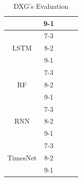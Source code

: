 \documentclass{ieeeojies}
\begin{document}
\begin{table}[H]
\begin{tabular}{|ccccc|}
  \multicolumn{1}{|c|}{}                                   & \multicolumn{1}{c|}{9-1}        & \multicolumn{1}{c|}{}        & \multicolumn{1}{c|}{}          &       \\ \hline
  \multicolumn{1}{|c|}{\multirow{3}{*}{LSTM}}              & \multicolumn{1}{c|}{7-3}            & \multicolumn{1}{c|}{}  & \multicolumn{1}{c|}{}      &  \\ \cline{2-5} 
  \multicolumn{1}{|c|}{}                                   & \multicolumn{1}{c|}{8-2}        & \multicolumn{1}{c|}{}  & \multicolumn{1}{c|}{}      &  \\ \cline{2-5} 
  \multicolumn{1}{|c|}{}                                   & \multicolumn{1}{c|}{9-1}        & \multicolumn{1}{c|}{}  & \multicolumn{1}{c|}{}      &  \\ \hline
  \multicolumn{1}{|c|}{\multirow{3}{*}{RF}}                & \multicolumn{1}{c|}{7-3}            & \multicolumn{1}{c|}{}        & \multicolumn{1}{c|}{}          &       \\ \cline{2-5} 
  \multicolumn{1}{|c|}{}                                   & \multicolumn{1}{c|}{8-2}        & \multicolumn{1}{c|}{}        & \multicolumn{1}{c|}{}          &       \\ \cline{2-5} 
  \multicolumn{1}{|c|}{}                                   & \multicolumn{1}{c|}{9-1}        & \multicolumn{1}{c|}{}        & \multicolumn{1}{c|}{}          &       \\ \hline
  \multicolumn{1}{|c|}{\multirow{3}{*}{RNN}}               & \multicolumn{1}{c|}{7-3}            & \multicolumn{1}{c|}{}        & \multicolumn{1}{c|}{}          &       \\ \cline{2-5} 
  \multicolumn{1}{|c|}{}                                   & \multicolumn{1}{c|}{8-2}        & \multicolumn{1}{c|}{}        & \multicolumn{1}{c|}{}          &       \\ \cline{2-5} 
  \multicolumn{1}{|c|}{}                                   & \multicolumn{1}{c|}{9-1}        & \multicolumn{1}{c|}{}        & \multicolumn{1}{c|}{}          &       \\ \hline
  \multicolumn{1}{|c|}{\multirow{3}{*}{TimesNet}}          & \multicolumn{1}{c|}{7-3}            & \multicolumn{1}{c|}{} & \multicolumn{1}{c|}{}     &  \\ \cline{2-5} 
  \multicolumn{1}{|c|}{}                                   & \multicolumn{1}{c|}{8-2}        & \multicolumn{1}{c|}{} & \multicolumn{1}{c|}{}     &  \\ \cline{2-5} 
  \multicolumn{1}{|c|}{}                                   & \multicolumn{1}{c|}{9-1}        & \multicolumn{1}{c|}{} & \multicolumn{1}{c|}{}     &  \\ \hline
  \end{tabular}
  \caption{DXG's Evaluation}
    \label{vcbresult}
  \end{table}
\end{document}
